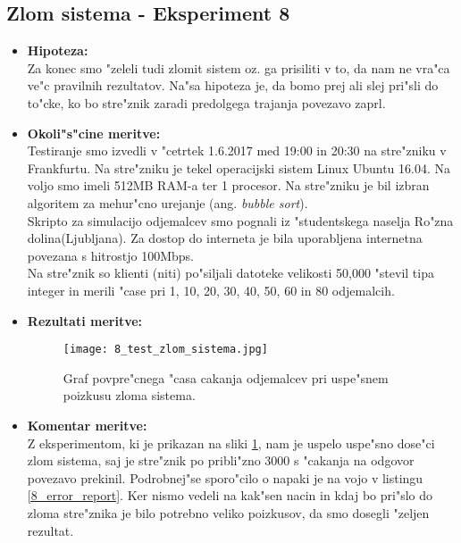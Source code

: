 \subsection{Zlom sistema - Eksperiment 8}
    \begin{itemize}
    	\item \textbf{Hipoteza: }  \\
    		Za konec smo "zeleli tudi zlomit sistem oz. ga prisiliti v to, da nam ne vra"ca ve"c pravilnih rezultatov. Na"sa hipoteza je, da bomo prej ali slej pri"sli do to"cke, ko bo stre"znik zaradi predolgega trajanja povezavo zaprl.

    	\item \textbf{Okoli"s"cine meritve: } \\
    			Testiranje smo izvedli v "cetrtek 1.6.2017 med 19:00 in 20:30 na stre"zniku v Frankfurtu. Na stre"zniku je tekel operacijski sistem Linux Ubuntu 16.04. Na voljo smo imeli 512MB RAM-a ter 1 procesor. Na stre"zniku je bil izbran algoritem za mehur"cno urejanje (ang. \textit{bubble sort}).\\ Skripto za simulacijo odjemalcev smo pognali iz "studentskega naselja Ro"zna dolina(Ljubljana). Za dostop do interneta je bila uporabljena internetna povezana s hitrostjo 100Mbps.\\ Na stre"znik so klienti (niti) po"siljali datoteke velikosti 50,000  "stevil tipa integer in merili "case pri 1, 10, 20, 30, 40, 50, 60 in 80 odjemalcih.

     	\item \textbf{Rezultati meritve: }  \\
    		\begin{figure}[h!]
  		\centering
  		  \texttt{[image: 8\_test\_zlom\_sistema.jpg]}
  		\caption{Graf povpre"cnega "casa cakanja odjemalcev pri uspe"snem poizkusu zloma sistema. }
  		\label{8_graf_zlom_sistema}
		\end{figure}
    		 \newpage
    	\item \textbf{Komentar meritve: } \\
    		Z eksperimentom, ki je prikazan na sliki \ref{8_graf_zlom_sistema}, nam je uspelo uspe"sno dose"ci zlom sistema, saj je stre"znik po pribli"zno 3000 s "cakanja na odgovor povezavo prekinil. Podrobnej"se sporo"cilo o napaki je na vojo v listingu \ref{8_error_report}.
		Ker nismo vedeli na kak"sen nacin in kdaj bo pri"slo do zloma stre"znika je bilo potrebno veliko poizkusov, da smo dosegli "zeljen rezultat.


\end{itemize}
